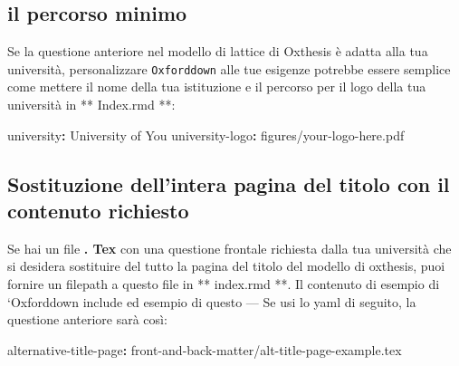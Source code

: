 \documentclass[a4paper, 11pt, nobind]{templates/ociamthesis}
\newenvironment{Shaded}{\begin{snugshade}}{\end{snugshade}}
\newcommand{\AttributeTok}[1]{\textcolor[rgb]{0.77,0.63,0.00}{#1}}
\newcommand{\FunctionTok}[1]{\textcolor[rgb]{0.00,0.00,0.00}{#1}}
\newcommand{\KeywordTok}[1]{\textcolor[rgb]{0.13,0.29,0.53}{\textbf{#1}}}
\renewenvironment{Shaded}
{
  \vspace{10pt}%
  \begin{snugshade}%
}{%
  \end{snugshade}%
  \vspace{8pt}%
}
\begin{document}
\hypertarget{il-percorso-minimo}{%
\subsection{il percorso minimo}\label{il-percorso-minimo}}

Se la questione anteriore nel modello di lattice di Oxthesis è adatta alla tua università, personalizzare \texttt{Oxforddown} alle tue esigenze potrebbe essere semplice come mettere il nome della tua istituzione e il percorso per il logo della tua università in ** Index.rmd **:

\begin{Shaded}
\begin{Highlighting}[]
\FunctionTok{university}\KeywordTok{:}\AttributeTok{ University of You}
\FunctionTok{university{-}logo}\KeywordTok{:}\AttributeTok{ figures/your{-}logo{-}here.pdf}
\end{Highlighting}
\end{Shaded}

\hypertarget{sostituzione-dellintera-pagina-del-titolo-con-il-contenuto-richiesto}{%
\subsection{Sostituzione dell'intera pagina del titolo con il contenuto richiesto}\label{sostituzione-dellintera-pagina-del-titolo-con-il-contenuto-richiesto}}

Se hai un file \textbf{. Tex } con una questione frontale richiesta dalla tua università che si desidera sostituire del tutto la pagina del titolo del modello di oxthesis, puoi fornire un filepath a questo file in ** index.rmd **.
Il contenuto di esempio di `Oxforddown include ed esempio di questo --- Se usi lo yaml di seguito, la questione anteriore sarà così:

\begin{Shaded}
\begin{Highlighting}[]
\FunctionTok{alternative{-}title{-}page}\KeywordTok{:}\AttributeTok{ front{-}and{-}back{-}matter/alt{-}title{-}page{-}example.tex}
\end{Highlighting}
\end{Shaded}
\end{document}
